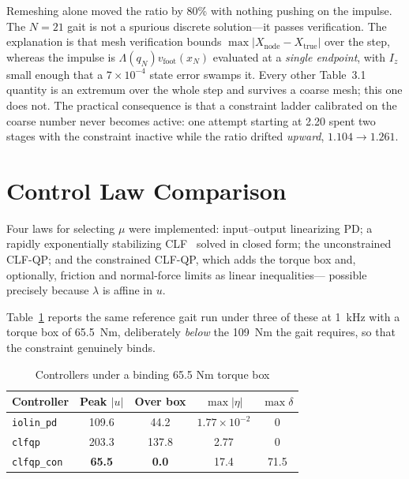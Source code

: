 \documentclass[10pt,conference]{IEEEtran}
\begin{document}
Remeshing alone moved the ratio by 80\% with nothing pushing on the impulse. The
$N=21$ gait is not a spurious discrete solution---it passes verification. The
explanation is that mesh verification bounds
$\max|X_{\mathrm{node}} - X_{\mathrm{true}}|$ over the step, whereas the impulse
is $\Lambda(q_N)v_{\mathrm{foot}}(x_N)$ evaluated at a \emph{single endpoint},
with $I_z$ small enough that a $7\times10^{-4}$ state error swamps it. Every
other Table~3.1 quantity is an extremum over the whole step and survives a coarse
mesh; this one does not. The practical consequence is that a constraint ladder
calibrated on the coarse number never becomes active: one attempt starting at
2.20 spent two stages with the constraint inactive while the ratio drifted
\emph{upward}, $1.104 \to 1.261$.

\section{Control Law Comparison}
\label{sec:control}

Four laws for selecting $\mu$ were implemented: input--output linearizing PD;
a rapidly exponentially stabilizing CLF~\cite{ames2014} solved in closed form;
the unconstrained CLF-QP; and the constrained CLF-QP, which adds the torque box
and, optionally, friction and normal-force limits as linear inequalities---
possible precisely because $\lambda$ is affine in $u$.

Table~\ref{tab:control} reports the same reference gait run under three of these
at 1~kHz with a torque box of 65.5~Nm, deliberately \emph{below} the 109~Nm the
gait requires, so that the constraint genuinely binds.

\begin{table}[t]
\caption{Controllers under a binding 65.5 Nm torque box}
\label{tab:control}
\centering
\begin{tabular}{lcccc}
\toprule
Controller & Peak $|u|$ & Over box & $\max|\eta|$ & $\max\delta$ \\
\midrule
\texttt{iolin\_pd}   & 109.6 & 44.2  & $1.77\times10^{-2}$ & 0 \\
\texttt{clfqp}       & 203.3 & 137.8 & 2.77 & 0 \\
\texttt{clfqp\_con}  & \textbf{65.5} & \textbf{0.0} & 17.4 & 71.5 \\
\bottomrule
\end{tabular}
\end{table}
\end{document}
